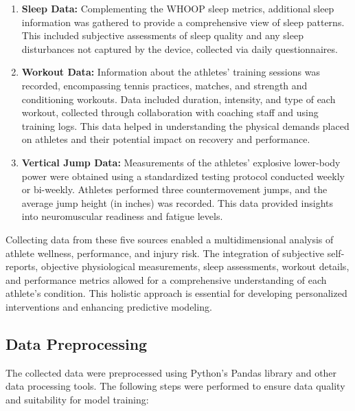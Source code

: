 \documentclass[manuscript,acmsmall,review,screen,authorversion=true]{acmart}
\begin{document}
\begin{enumerate}
    \item \textbf{Sleep Data:} Complementing the WHOOP sleep metrics, additional sleep information was gathered to provide a comprehensive view of sleep patterns. This included subjective assessments of sleep quality and any sleep disturbances not captured by the device, collected via daily questionnaires.

    \item \textbf{Workout Data:} Information about the athletes' training sessions was recorded, encompassing tennis practices, matches, and strength and conditioning workouts. Data included duration, intensity, and type of each workout, collected through collaboration with coaching staff and using training logs. This data helped in understanding the physical demands placed on athletes and their potential impact on recovery and performance.

    \item \textbf{Vertical Jump Data:} Measurements of the athletes' explosive lower-body power were obtained using a standardized testing protocol conducted weekly or bi-weekly. Athletes performed three countermovement jumps, and the average jump height (in inches) was recorded. This data provided insights into neuromuscular readiness and fatigue levels.
\end{enumerate}

Collecting data from these five sources enabled a multidimensional analysis of athlete wellness, performance, and injury risk. The integration of subjective self-reports, objective physiological measurements, sleep assessments, workout details, and performance metrics allowed for a comprehensive understanding of each athlete's condition. This holistic approach is essential for developing personalized interventions and enhancing predictive modeling.

\subsection{Data Preprocessing}

The collected data were preprocessed using Python’s Pandas library and other data processing tools. The following steps were performed to ensure data quality and suitability for model training:
\end{document}
